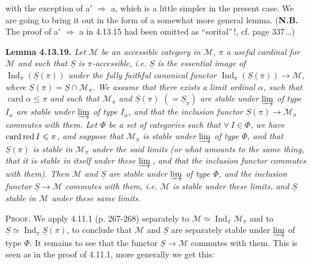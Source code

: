 \documentclass[11pt]{article}
\newcommand{\printedpage}[1]{\marginpar{\footnotesize p.~#1}}
\newcommand{\msp}[1]{\marginpar{\footnotesize [#1]}}
\newcommand{\Ind}{\operatorname{Ind}}
\newcommand{\card}{\operatorname{card}}
\newcommand{\cardred}{\mathop{\textup{card\,red}}\nolimits}
\begin{document}
\setcounter{footnote}{143}

\printedpage{129}

\msp{page 340}
with the exception of a$'$ $\Longrightarrow$ a, which is a little simpler in the present case. We are going to bring it out in the form of a somewhat more general lemma. (\textbf{N.B.} The proof of a$'$ $\Longrightarrow$ a in 4.13.15 had been omitted as ``sorital''\,!, cf. page 337\,\dots)

\textbf{Lemma 4.13.19.} \textit{Let $\mathcal{M}$ be an accessible category in $\mathcal{M}$, $\pi$ a useful cardinal for $\mathcal{M}$ and such that $\underline{S}$ is $\pi$-accessible, i.e. $\underline{S}$ is the essential image of $\Ind_\pi(\underline{S}(\pi))$ under the fully faithful canonical functor $\Ind_\pi(\underline{S}(\pi))\longrightarrow\mathcal{M}$, where $\underline{S}(\pi)=\underline{S}\cap\mathcal{M}_\pi$. We assume that there exists a limit ordinal $\alpha$, such that $\card\alpha\leqslant\pi$ and such that $\mathcal{M}_\pi$ and $\underline{S}(\pi)$ $(=\underline{S}_\pi)$ are stable under $\varinjlim$ of type $I_\alpha$ are stable under $\varinjlim$ of type $I_\alpha$, and that the inclusion functor $\underline{S}(\pi)\longrightarrow\mathcal{M}_\pi$ commutes with them. Let $\Phi$ be a set of categories such that $\forall\ I\in\Phi$, we have $\cardred I\leqslant\pi$, and suppose that $\mathcal{M}_\pi$ is stable under $\varinjlim$ of type $\Phi$, and that $\underline{S}(\pi)$ is stable in $\mathcal{M}_\pi$ under the said limits (or what amounts to the same thing, that it is stable in itself under these $\varinjlim$\,, and that the inclusion functor commutes with them). Then $\mathcal{M}$ and $\underline{S}$ are stable under $\varinjlim$ of type $\Phi$, and the inclusion functor $\underline{S}\longrightarrow\mathcal{M}$ commutes with them, i.e. $\mathcal{M}$ is stable under these limits, and $\underline{S}$ stable in $\mathcal{M}$ under these same limits.} %

\msp{page 341}
\textsc{Proof}. We apply 4.11.1 (p. 267-268) separately to $\mathcal{M}\simeq\Ind_\pi\mathcal{M}_\pi$ and to $\underline{S}\simeq\Ind_\pi\underline{S}(\pi)$, to conclude that $\mathcal{M}$ and $\underline{S}$ are separately stable under $\varinjlim$ of type $\Phi$. It remains to see that the functor $\underline{S}\longrightarrow\mathcal{M}$ commutes with them. This is seen as in the proof of 4.11.1, more generally we get this:
\end{document}
